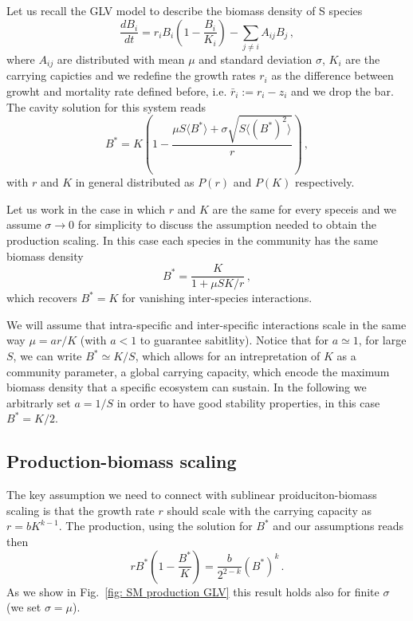 \documentclass[10pt]{article}
\begin{document}
Let us recall the GLV model to describe the 
biomass density of S species
\begin{equation}
    \frac{d B_i}{dt} = r_iB_i\left(1-\frac{B_i}{K_i}\right) - \sum_{j\neq i}A_{ij}B_j \, ,
\end{equation}
where $A_{ij}$ are distributed with mean $\mu$ and standard deviation $\sigma$, 
$K_i$ are the carrying capicties and we redefine the growth rates $r_i$
as the difference between growht and mortality rate defined before, i.e.
$\bar{r}_i:=r_i-z_i$ and we drop the bar.
The cavity solution for this system reads~\cite{Bunin2017}
\begin{equation}
    B^* = K\left(1 - \frac{\mu S\langle B^*\rangle +
    \sigma\sqrt{S\langle (B^*)^2\rangle}}{r}\right) \, ,
    \label{eq: SM cavity GLV}
\end{equation}
with $r$ and $K$ in general distributed as $P(r)$ and $P(K)$
respectively.

Let us work in the case in which $r$ and $K$ are the same for every speceis 
and we assume $\sigma\to 0$ for simplicity to discuss the assumption
needed to obtain the production scaling. In this case 
each species in the community has the same biomass density
\begin{equation}
    B^* = \frac{K}{1+\mu S K/r} \, ,
\end{equation}
which recovers $B^* = K$ for vanishing inter-species interactions.

We will assume that intra-specific and inter-specific 
interactions scale in the same way $\mu = a  r / K$ 
(with $a<1$ to guarantee sabitlity).
Notice that for $a\simeq1$, for large $S$, we can write
$B^* \simeq K/S$,
which allows for an intrepretation of $K$
as a community parameter, a global carrying capacity, 
which encode the maximum biomass density that a specific ecosystem can
sustain. In the following we arbitrarly set $a=1/S$ in order
to have good stability properties, in this case $B^*=K/2$. 

\subsection{Production-biomass scaling}
The key assumption we need to connect with sublinear proiduciton-biomass 
scaling is that the growth rate $r$ should scale with the carrying capacity as
$r=bK^{k-1}$.
The production, using the solution for $B^*$ and our assumptions reads then
\begin{equation}
    rB^*\left(1-\frac{B^*}{K}\right) = \frac{b}{2^{2-k}}(B^*)^{k} \, .
    \label{eq: SM analytic production GLV}
\end{equation}
As we show in Fig.~\ref{fig: SM production GLV} this result holds also
for finite $\sigma$ (we set $\sigma=\mu$).
\end{document}
